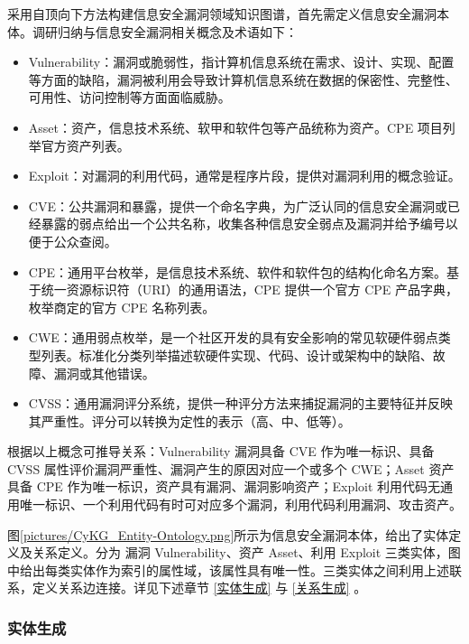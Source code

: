 \documentclass[a4paper,AutoFakeBold,oneside,12pt]{book}
\begin{document}
采用自顶向下方法构建信息安全漏洞领域知识图谱，首先需定义信息安全漏洞本体。调研归纳与信息安全漏洞相关概念及术语如下：
\begin{itemize}
	\item Vulnerability：漏洞或脆弱性，指计算机信息系统在需求、设计、实现、配置等方面的缺陷，漏洞被利用会导致计算机信息系统在数据的保密性、完整性、可用性、访问控制等方面面临威胁。\cite{cnnvd_vul_category}
	\item Asset：资产，信息技术系统、软甲和软件包等产品统称为资产。CPE 项目列举官方资产列表。
	\item Exploit：对漏洞的利用代码，通常是程序片段，提供对漏洞利用的概念验证。
	\item CVE：公共漏洞和暴露，提供一个命名字典，为广泛认同的信息安全漏洞或已经暴露的弱点给出一个公共名称，收集各种信息安全弱点及漏洞并给予编号以便于公众查阅。\cite{cve_intro}
	\item CPE：通用平台枚举，是信息技术系统、软件和软件包的结构化命名方案。基于统一资源标识符（URI）的通用语法，CPE 提供一个官方 CPE 产品字典，枚举商定的官方 CPE 名称列表。\cite{cpe_intro}
	\item CWE：通用弱点枚举，是一个社区开发的具有安全影响的常见软硬件弱点类型列表。标准化分类列举描述软硬件实现、代码、设计或架构中的缺陷、故障、漏洞或其他错误。\cite{cwe_intro}
	\item CVSS：通用漏洞评分系统，提供一种评分方法来捕捉漏洞的主要特征并反映其严重性。评分可以转换为定性的表示（高、中、低等）。\cite{cvss_intro}
\end{itemize}

根据以上概念可推导关系：Vulnerability 漏洞具备 CVE 作为唯一标识、具备 CVSS 属性评价漏洞严重性、漏洞产生的原因对应一个或多个 CWE；Asset 资产具备 CPE 作为唯一标识，资产具有漏洞、漏洞影响资产；Exploit 利用代码无通用唯一标识、一个利用代码有时可对应多个漏洞，利用代码利用漏洞、攻击资产。

图\ref{pictures/CyKG_Entity-Ontology.png}所示为信息安全漏洞本体，给出了实体定义及关系定义。分为  漏洞 Vulnerability、资产 Asset、利用 Exploit 三类实体，图中给出每类实体作为索引的属性域，该属性具有唯一性。三类实体之间利用上述联系，定义关系边连接。详见下述章节 \ref{实体生成} 与 \ref{关系生成} 。


\subsubsection{实体生成\label{实体生成}}
\end{document}
